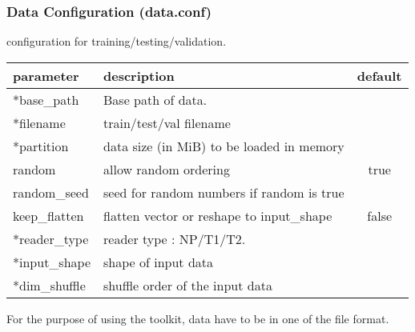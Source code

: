\subsubsection{Data Configuration (data.conf)}
\begin{table}[!htbp]
\begin{center}
  \medskip  \small configuration for training/testing/validation.
   \begin{tabular}{|l|p{8cm}|c|} \hline
   	\textbf{parameter} & \textbf{description} & \textbf{default}\\  \hline
 	*base\_path & Base path of data. &  \\  \hline
   	*filename &  train/test/val filename & \\  \hline
	*partition & data size (in MiB) to be loaded in memory & \\  \hline
	random & allow random ordering  & true \\  \hline
	random\_seed & seed for random numbers if random is true & \\  \hline 
	keep\_flatten & flatten vector or reshape to input\_shape & false \\  \hline
	*reader\_type & reader type : NP/T1/T2. & \\  \hline		
	*input\_shape & shape of input data & \\  \hline
	*dim\_shuffle &  shuffle order of the input data &  \\ \hline
  \end{tabular}		
\end{center}
\end{table} 
\noindent For the purpose of using the toolkit, data have to be in one of the file format.
